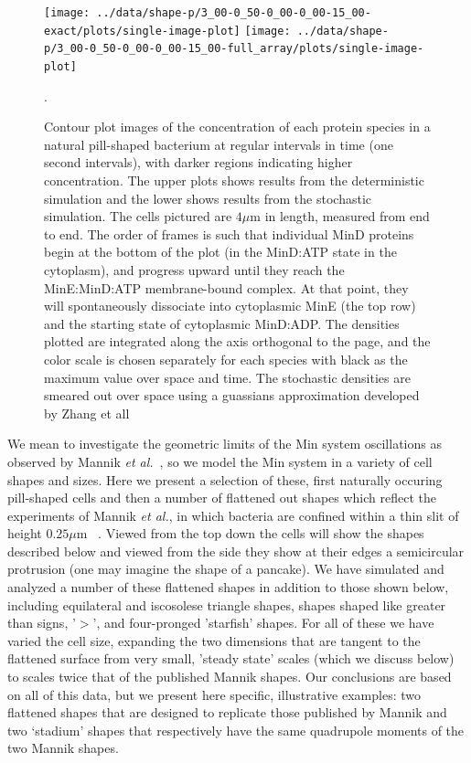 \documentclass[letterpaper,twocolumn,amsmath,amssymb,pre]{revtex4-1}
\newcommand\micron{\ensuremath{\mu\text{m}}}
\begin{document}
\begin{figure}
  \texttt{[image: ../data/shape-p/3\_00-0\_50-0\_00-0\_00-15\_00-exact/plots/single-image-plot]}
  \texttt{[image: ../data/shape-p/3\_00-0\_50-0\_00-0\_00-15\_00-full\_array/plots/single-image-plot]}
  \caption{Contour plot images of the concentration of each protein
    species in a natural pill-shaped bacterium at regular intervals in
    time (one second intervals), with darker regions indicating higher
    concentration. The upper plots shows results from the
    deterministic simulation and the lower shows results from the
    stochastic simulation.  The cells pictured are $4\micron$ in
    length, measured from end to end.  The order of frames is such
    that individual MinD proteins begin at the bottom of the plot (in
    the MinD:ATP state in the cytoplasm), and progress upward until
    they reach the MinE:MinD:ATP membrane-bound complex.  At that
    point, they will spontaneously dissociate into cytoplasmic MinE
    (the top row) and the starting state of cytoplasmic MinD:ADP.  The
    densities plotted are integrated along the axis orthogonal to the
    page, and the color scale is chosen separately for each species
    with black as the maximum value over space and time.  The
    stochastic densities are smeared out over space using a guassians
    approximation developed by Zhang et all~\cite{zhang2007gaussian}}.
  \label{image-p}
\end{figure}

We mean to investigate the geometric limits of the Min system
oscillations as observed by Mannik \emph{et
  al.}~\cite{mannik2012robustness}, so we model the Min system in a
variety of cell shapes and sizes.  Here we present a selection of
these, first naturally occuring pill-shaped cells and then a number of
flattened out shapes which reflect the experiments of Mannik \emph{et
  al.}, in which bacteria are confined within a thin slit of height
$0.25\micron$ ~\cite{mannik2012robustness}. Viewed from the top down
the cells will show the shapes described below and viewed from the
side they show at their edges a semicircular protrusion (one may
imagine the shape of a pancake). We have simulated and analyzed a
number of these flattened shapes in addition to those shown below,
including equilateral and iscosolese triangle shapes, shapes shaped
like greater than signs, '$>$', and four-pronged 'starfish' shapes.
For all of these we have varied the cell size, expanding the two
dimensions that are tangent to the flattened surface from very small,
'steady state' scales (which we discuss below) to scales twice that of
the published Mannik shapes.  Our conclusions are based on all of this
data, but we present here specific, illustrative examples: two
flattened shapes that are designed to replicate those published by
Mannik and two `stadium' shapes that respectively have the same
quadrupole moments of the two Mannik shapes.
\end{document}
